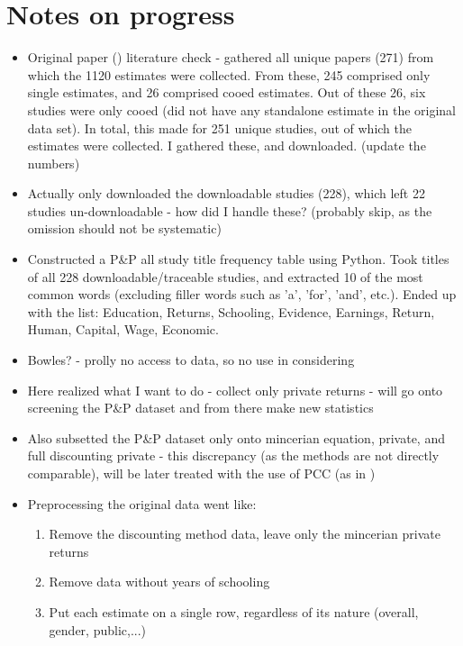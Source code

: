 \chapter{Notes on progress}

\begin{itemize}
    \item Original paper (\cite{psacharopoulos2018meta}) literature check - gathered all unique papers (271) from which the 1120 estimates were collected. From these, 245 comprised only single estimates, and 26 comprised cooed estimates. Out of these 26, six studies were only cooed (did not have any standalone estimate in the original data set).
    In total, this made for 251 unique studies, out of which the estimates were collected. I gathered these, and downloaded. (update the numbers)
    \item Actually only downloaded the downloadable studies (228), which left 22 studies un-downloadable - how did I handle these? (probably skip, as the omission should not be systematic)
    \item Constructed a P\&P all study title frequency table using Python. Took titles of all 228 downloadable/traceable studies, and extracted 10 of the most common words (excluding filler words such as 'a', 'for', 'and', etc.). Ended up with the list: Education, Returns, Schooling, Evidence, Earnings, Return, Human, Capital, Wage, Economic.
    \item Bowles? - prolly no access to data, so no use in considering
    \item Here realized what I want to do - collect only private returns - will go onto screening the P\&P dataset and from there make new statistics
    \item Also subsetted the P\&P dataset only onto mincerian equation, private, and full discounting private - this discrepancy (as the methods are not directly comparable), will be later treated with the use of PCC (as in \cite{ma2021meta})
    \item Preprocessing the original data went like:
        \begin{enumerate}
            \item Remove the discounting method data, leave only the mincerian private returns
            \item Remove data without years of schooling
            \item Put each estimate on a single row, regardless of its nature (overall, gender, public,...)
        \end{enumerate}

\end{itemize}
